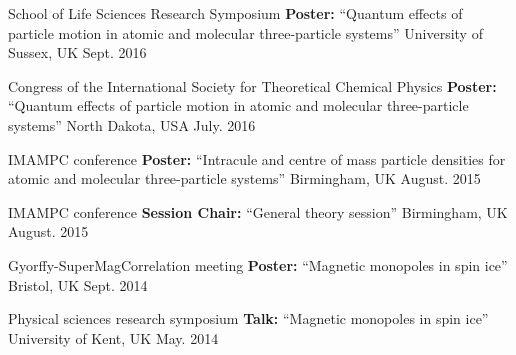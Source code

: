 \begin{cventries}

\cvpresen
{School of Life Sciences Research Symposium} %
{\textbf{Poster:} \normalfont``Quantum effects of particle motion in atomic and molecular three-particle systems''} %
{University of Sussex, UK} %
{Sept. 2016} %
{ %
}


\cvpresen
{ Congress of the International Society for Theoretical Chemical Physics} %
{\textbf{Poster:} \normalfont``Quantum effects of particle motion in atomic and molecular three-particle systems''} %
{North Dakota, USA} %
{July. 2016} %
{ %
}


\cvpresen
{IMAMPC conference} %
{\textbf{Poster:} \normalfont``Intracule and centre of mass particle densities for atomic and molecular three-particle systems''} %
{Birmingham, UK} %
{August. 2015} %
{ %
}


\cvpresen
{IMAMPC conference} %
{\textbf{Session Chair:} \normalfont``General theory session''} %
{Birmingham, UK} %
{August. 2015} %
{ %
}


\cvpresen
{Gyorffy-SuperMagCorrelation meeting} %
{\textbf{Poster:} \normalfont``Magnetic monopoles in spin ice''} %
{Bristol, UK} %
{Sept. 2014} %
{ %
}


\cvpresen
{Physical sciences research symposium} %
{\textbf{Talk:} \normalfont``Magnetic monopoles in spin ice''} %
{University of Kent, UK} %
{May. 2014} %
{ %
}


\end{cventries}